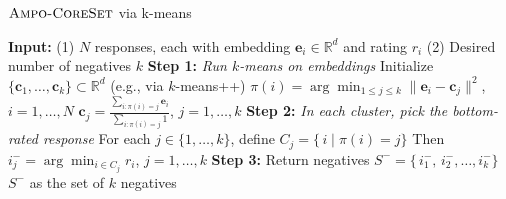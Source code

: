 \begin{algorithm}[tb]
\caption{\textcolor{titlecolor}{$\textsc{Ampo-CoreSet}$ via k-means}}
\label{alg:cluster_negatives}
\begin{algorithmic}[1]
    \STATE \textcolor{inputcolor}{\textbf{Input:}}
    \STATE \textcolor{inputcolor}{(1) $N$ responses, each with embedding $\mathbf{e}_i \in \mathbb{R}^d$ and rating $r_i$}
    \STATE \textcolor{inputcolor}{(2) Desired number of negatives $k$}
    \STATE
    \STATE \textcolor{stepcolor}{\textbf{Step 1:} \textit{Run $k$-means on embeddings}}
    \STATE \textcolor{mathcolor}{Initialize $\{\mathbf{c}_1,\dots,\mathbf{c}_k\} \subset \mathbb{R}^d$ (e.g., via $k$-means++)}
    \REPEAT
        \STATE \textcolor{mathcolor}{$\pi(i) = \arg\min_{1 \le j \le k} \|\mathbf{e}_i - \mathbf{c}_j\|^2$, \quad $i = 1,\dots,N$}
        \STATE \textcolor{mathcolor}{$\mathbf{c}_j = \frac{\sum_{i:\pi(i)=j}\mathbf{e}_i}{\sum_{i:\pi(i)=j}1}$, \quad $j = 1,\dots,k$} \label{eq:vanilla_kmeans}
    \STATE
    \STATE \textcolor{stepcolor}{\textbf{Step 2:} \textit{In each cluster, pick the bottom-rated response}}
    \STATE \textcolor{mathcolor}{For each $j \in \{1,\dots,k\}$, define $C_j = \{\, i \mid \pi(i) = j \}$}
    \STATE \textcolor{mathcolor}{Then $i_j^- = \arg\min_{i\in C_j} r_i$, \quad $j = 1,\dots,k$}
    \STATE
    \STATE \textcolor{stepcolor}{\textbf{Step 3:} Return negatives}
    \STATE \textcolor{mathcolor}{$S^- = \{\, i_1^-,\, i_2^- ,\dots, i_k^- \}$}
    \RETURN \textcolor{outputcolor}{$S^-$ as the set of $k$ negatives}
\end{algorithmic}
\end{algorithm}




